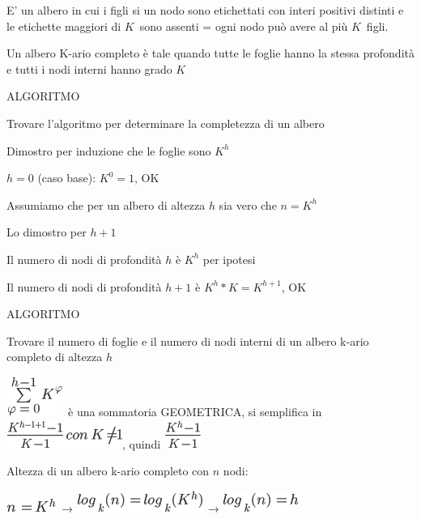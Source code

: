 \documentclass{article}
\begin{document}
{E' un albero in cui i figli si un nodo sono etichettati con interi
positivi distinti e le etichette maggiori di
}$K${~sono assenti = ogni nodo può
avere al più }$K${~figli.}

{}

{Un albero K-ario completo è tale quando tutte le foglie hanno la stessa
profondità e tutti i nodi interni hanno grado
}$K${~}

{}

{ALGORITMO}

{Trovare l'algoritmo per determinare la completezza di un albero}

{Dimostro per induzione che le foglie sono $K^h$}


{$h=0$ (caso base): $K^0=1$, OK}

{Assumiamo che per un albero di altezza $h$ sia vero che $n=K^h$}

{Lo dimostro per $h+1$}

{Il numero di nodi di profondità $h$ è $K^h$ per ipotesi}

{Il numero di nodi di profondità $h+1$ è $K^h*K=K^{h+1}$, OK}

{ALGORITMO}

{Trovare il numero di foglie e il numero di nodi interni di un albero k-ario completo di altezza $h$}

\includegraphics{images/image93.png}{~è una sommatoria GEOMETRICA, si
semplifica in }\includegraphics{images/image94.png}{, quindi
}\includegraphics{images/image95.png}

{Altezza di un albero k-ario completo con $n$ nodi:}

\includegraphics{images/image96.png}{~→
}\includegraphics{images/image97.png}{~→
}\includegraphics{images/image98.png}
\end{document}
